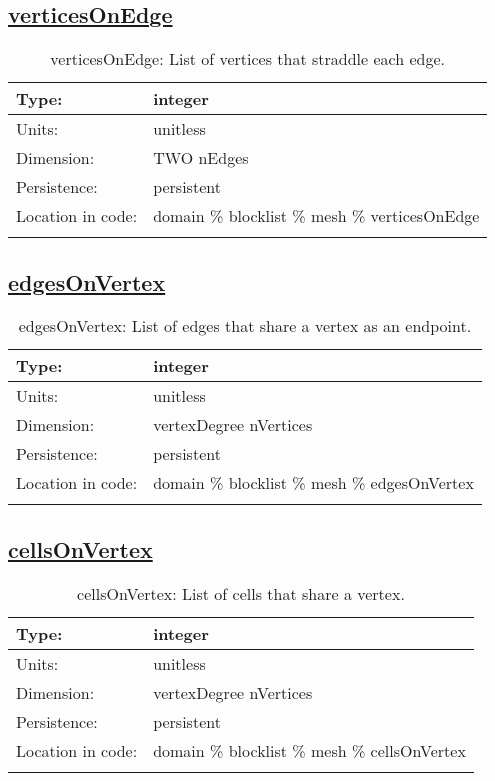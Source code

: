 \subsection[verticesOnEdge]{\hyperref[sec:var_tab_mesh]{verticesOnEdge}}
\label{subsec:var_sec_mesh_verticesOnEdge}
\begin{center}
\begin{longtable}{| p{2.0in} | p{4.0in} |}
        \hline 
        Type: & integer \\
        \hline 
        Units: & \si{unitless} \\
        \hline 
        Dimension: & TWO nEdges \\
        \hline 
        Persistence: & persistent \\
        \hline 
         Location in code: & domain \% blocklist \% mesh \% verticesOnEdge \\
         \hline 
    \caption{verticesOnEdge: List of vertices that straddle each edge.}
\end{longtable}
\end{center}
\subsection[edgesOnVertex]{\hyperref[sec:var_tab_mesh]{edgesOnVertex}}
\label{subsec:var_sec_mesh_edgesOnVertex}
\begin{center}
\begin{longtable}{| p{2.0in} | p{4.0in} |}
        \hline 
        Type: & integer \\
        \hline 
        Units: & \si{unitless} \\
        \hline 
        Dimension: & vertexDegree nVertices \\
        \hline 
        Persistence: & persistent \\
        \hline 
         Location in code: & domain \% blocklist \% mesh \% edgesOnVertex \\
         \hline 
    \caption{edgesOnVertex: List of edges that share a vertex as an endpoint.}
\end{longtable}
\end{center}
\subsection[cellsOnVertex]{\hyperref[sec:var_tab_mesh]{cellsOnVertex}}
\label{subsec:var_sec_mesh_cellsOnVertex}
\begin{center}
\begin{longtable}{| p{2.0in} | p{4.0in} |}
        \hline 
        Type: & integer \\
        \hline 
        Units: & \si{unitless} \\
        \hline 
        Dimension: & vertexDegree nVertices \\
        \hline 
        Persistence: & persistent \\
        \hline 
         Location in code: & domain \% blocklist \% mesh \% cellsOnVertex \\
         \hline 
    \caption{cellsOnVertex: List of cells that share a vertex.}
\end{longtable}
\end{center}
